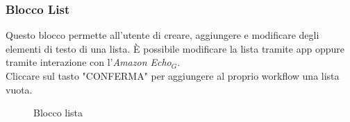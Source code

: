 \subsubsection{Blocco List}
Questo blocco permette all'utente di creare, aggiungere e modificare degli elementi di testo di una lista.
È possibile modificare la lista tramite app oppure tramite interazione con l'\textit{Amazon Echo$_{G}$}. \\ 
Cliccare sul tasto "CONFERMA" per aggiungere al proprio workflow una lista vuota.
\begin{figure}[!ht]
	\centering
	\caption{Blocco lista}
\end{figure}
